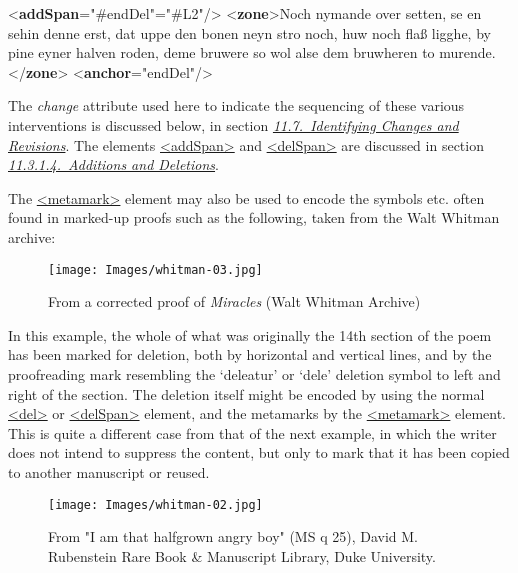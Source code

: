 \begin{shaded}
{<\textbf{addSpan}\hspace*{1em}{spanTo}="{\#endDel}"\hspace*{1em}{change}="{\#L2}"/>}\mbox{}\newline 
{<\textbf{zone}>}Noch nymande over setten, se en sehin denne erst, dat uppe den bonen neyn\mbox{}\newline 
 stro noch, huw noch flaß ligghe, by pine eyner halven roden, deme bruwere so\mbox{}\newline 
 wol alse dem bruwheren to murende.{</\textbf{zone}>}\mbox{}\newline 
{<\textbf{anchor}\hspace*{1em}{xml:id}="{endDel}"/>}\end{shaded}\egroup\par \par
The {\itshape change} attribute used here to indicate the sequencing of these various interventions is discussed below, in section \textit{\hyperref[PH-changes]{11.7.\ Identifying Changes and Revisions}}. The elements \hyperref[TEI.addSpan]{<addSpan>} and \hyperref[TEI.delSpan]{<delSpan>} are discussed in section \textit{\hyperref[PHAD]{11.3.1.4.\ Additions and Deletions}}.\par
The \hyperref[TEI.metamark]{<metamark>} element may also be used to encode the symbols etc. often found in marked-up proofs such as the following, taken from the Walt Whitman archive: \begin{figure}[htbp]
\noindent\noindent\texttt{[image: Images/whitman-03.jpg]}
\caption{From a corrected proof of \textit{Miracles} (Walt Whitman Archive)}\end{figure}
\par
In this example, the whole of what was originally the 14th section of the poem has been marked for deletion, both by horizontal and vertical lines, and by the proofreading mark resembling the ‘deleatur’ or ‘dele’ deletion symbol to left and right of the section. The deletion itself might be encoded by using the normal \hyperref[TEI.del]{<del>} or \hyperref[TEI.delSpan]{<delSpan>} element, and the metamarks by the \hyperref[TEI.metamark]{<metamark>} element. This is quite a different case from that of the next example, in which the writer does not intend to suppress the content, but only to mark that it has been copied to another manuscript or reused.\par
\begin{figure}[htbp]
\noindent\noindent\texttt{[image: Images/whitman-02.jpg]}
\caption{From "I am that halfgrown angry boy" (MS q 25), David M. Rubenstein Rare Book \& Manuscript Library, Duke University. }\end{figure}
